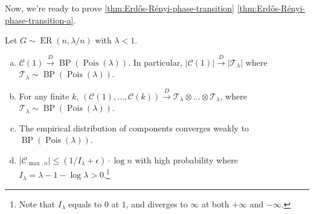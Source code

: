 Now, we're ready to prove \autoref{thm:Erdős-Rényi-phase-transition} \autoref{thm:Erdős-Rényi-phase-transition-a}.

\begin{lemma}\label{lma:component-of-extremely-sparse-Erdős-Rényi-graph}
	Let \(G \sim \operatorname{ER}(n, \lambda / n) \) with \(\lambda < 1\).
	\begin{enumerate}[(a)]
		\item\label{lma:component-of-extremely-sparse-Erdős-Rényi-graph-a}  \(\mathcal{C} (1) \overset{D}{\to} \operatorname{BP}(\operatorname{Pois}(\lambda ) ) \). In particular, \(\lvert \mathcal{C} (1) \rvert \overset{D}{\to} \lvert \mathcal{T} _\lambda  \rvert \) where \(\mathcal{T} _\lambda \sim \operatorname{BP}(\operatorname{Pois}(\lambda ) )\).
		\item\label{lma:component-of-extremely-sparse-Erdős-Rényi-graph-b} For any finite \(k\), \((\mathcal{C} (1), \dots , \mathcal{C} (k)) \overset{D}{\to} \mathcal{T} _\lambda \otimes \dots \otimes \mathcal{T} _\lambda \), where \(\mathcal{T} _\lambda \sim \operatorname{BP}(\operatorname{Pois}(\lambda ) )\).
		\item\label{lma:component-of-extremely-sparse-Erdős-Rényi-graph-c} The empirical distribution of components converges weakly to \(\operatorname{BP}(\operatorname{Pois}(\lambda ) ) \).
		\item\label{lma:component-of-extremely-sparse-Erdős-Rényi-graph-d} \(\lvert \mathcal{C} _{\max , n} \rvert \leq (1 / I_\lambda + \epsilon ) \cdot \log n\) with high probability where \(I_\lambda = \lambda - 1 - \log \lambda > 0\).\footnote{Note that \(I_\lambda \) equals to \(0\) at \(1\), and diverges to \(\infty \) at both \(+\infty \) and \(-\infty \).}
	\end{enumerate}
\end{lemma}
